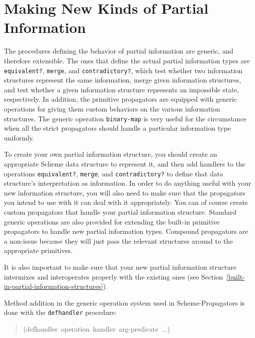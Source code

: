 \documentclass[12pt,letterpaper,english]{article}
\begin{document}

\hypertarget{making-new-kinds-of-partial-information}{}
\section{Making New Kinds of Partial Information}
\label{making-new-kinds-of-partial-information}

The procedures defining the behavior of partial information are
generic, and therefore extensible.  The ones that define the
actual partial information types are \texttt{equivalent?}, \texttt{merge}, and
\texttt{contradictory?}, which test whether two information structures
represent the same information, merge given information structures,
and test whether a given information structure represents an
impossible state, respectively.  In addition, the primitive
propagators are equipped with generic operations for giving them
custom behaviors on the various information structures.  The
generic operation \texttt{binary-map} is very useful for the circumstance
when all the strict propagators should handle a particular
information type uniformly.

To create your own partial information structure, you should create an
appropriate Scheme data structure to represent it, and then add
handlers to the operations \texttt{equivalent?}, \texttt{merge}, and
\texttt{contradictory?} to define that data structure's interpretation as
information.  In order to do anything useful with your new information
structure, you will also need to make sure that the propagators you
intend to use with it can deal with it appropriately.  You can of
course create custom propagators that handle your partial information
structure.  Standard generic operations are also provided for
extending the built-in primitive propagators to handle new partial
information types.  Compound propagators are a non-issue because they
will just pass the relevant structures around to the appropriate
primitives.

It is also important to make sure that your new partial information
structure intermixes and interoperates properly with the existing
ones (see Section~\ref{built-in-partial-information-structures}).

Method addition in the generic operation system used in
Scheme-Propagators is done with the \texttt{defhandler} procedure:
\begin{quote}{\ttfamily \raggedright \noindent
(defhandler~operation~handler~arg-predicate~...)
}\end{quote}
\end{document}
